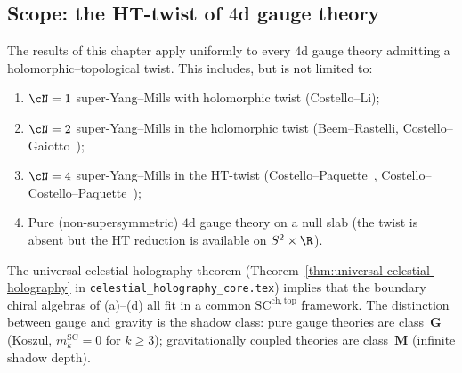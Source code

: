 \subsection{Scope: the HT-twist of $4$d gauge theory}
\label{subsec:ym-ht-scope}

The results of this chapter apply uniformly to every $4$d gauge theory
admitting a holomorphic--topological twist. This includes, but is not
limited to:
\begin{enumerate}[label=\textup{(\alph*)}]
\item $\cN=1$ super-Yang--Mills with holomorphic twist (Costello--Li);
\item $\cN=2$ super-Yang--Mills in the holomorphic twist
(Beem--Rastelli, Costello--Gaiotto~\cite{CostelloGaiottoBoundaryVOA});
\item $\cN=4$ super-Yang--Mills in the HT-twist
(Costello--Paquette~\cite{CostelloPaquetteTwistedSugraStates},
Costello--Costello--Paquette~\cite{CL16});
\item Pure (non-supersymmetric) $4$d gauge theory on a null slab
(the twist is absent but the HT reduction is available on
$S^2\times \R$).
\end{enumerate}
The universal celestial holography theorem
(Theorem~\ref{thm:universal-celestial-holography} in
\texttt{celestial\_holography\_core.tex}) implies that the boundary
chiral algebras of (a)--(d) all fit in a common
$\mathrm{SC}^{\mathrm{ch,top}}$ framework. The distinction between
gauge and gravity is the shadow class: pure gauge theories are
class~$\mathbf G$ (Koszul, $m_k^{\mathrm{SC}} = 0$ for $k\geq 3$);
gravitationally coupled theories are class~$\mathbf M$ (infinite
shadow depth).


